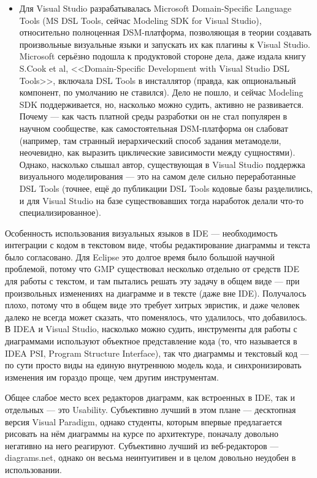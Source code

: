 \documentclass{text-style}
\begin{document}
\begin{itemize}
\begin{itemize}
        \item Для Visual Studio разрабатывалась Microsoft Domain-Specific Language Tools (MS DSL Tools, сейчас Modeling SDK for Visual Studio), относительно полноценная DSM-платформа, позволяющая в теории создавать произвольные визуальные языки и запускать их как плагины к Visual Studio. Microsoft серьёзно подошла к продуктовой стороне дела, даже издала книгу S.Cook et al, <<Domain-Specific Development with Visual Studio DSL Tools>>, включала DSL Tools в инсталлятор (правда, как опциональный компонент, по умолчанию не ставился). Дело не пошло, и сейчас Modeling SDK поддерживается, но, насколько можно судить, активно не развивается. Почему --- как часть платной среды разработки он не стал популярен в научном сообществе, как самостоятельная DSM-платформа он слабоват (например, там странный иерархический способ задания метамодели, неочевидно, как выразить циклические зависимости между сущностями). Однако, насколько слышал автор, существующая в Visual Studio поддержка визуального моделирования --- это на самом деле сильно переработанные DSL Tools (точнее, ещё до публикации DSL Tools кодовые базы разделились, и для Visual Studio на базе существовавших тогда наработок делали что-то специализированное).
    \end{itemize}
\end{itemize}


Особенность использования визуальных языков в IDE --- необходимость интеграции с кодом в текстовом виде, чтобы редактирование диаграммы и текста было согласовано. Для Eclipse это долгое время было большой научной проблемой, потому что GMP существовал несколько отдельно от средств IDE для работы с текстом, и там пытались решать эту задачу в общем виде --- при произвольных изменениях на диаграмме и в тексте (даже вне IDE). Получалось плохо, потому что в общем виде это требует хитрых эвристик, и даже человек далеко не всегда может сказать, что поменялось, что удалилось, что добавилось. В IDEA и Visual Studio, насколько можно судить, инструменты для работы с диаграммами используют объектное представление кода (то, что называется в IDEA PSI, Program Structure Interface), так что диаграммы и текстовый код --- по сути просто виды на единую внутреннюю модель кода, и синхронизировать изменения им гораздо проще, чем другим инструментам.

Общее слабое место всех редакторов диаграмм, как встроенных в IDE, так и отдельных --- это Usability. Субъективно лучший в этом плане --- десктопная версия Visual Paradigm, однако студенты, которым впервые предлагается рисовать на нём диаграммы на курсе по архитектуре, поначалу довольно негативно на него реагируют. Субъективно лучший из веб-редакторов --- diagrams.net, однако он весьма неинтуитивен и в целом довольно неудобен в использовании.
\end{document}
